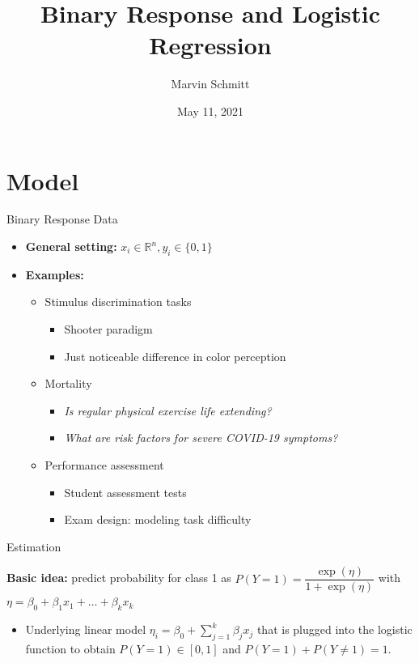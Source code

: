\documentclass[
  ignorenonframetext,
]{beamer}
\title{Binary Response and Logistic Regression}
\author{Marvin Schmitt}
\date{May 11, 2021}
\providecommand{\tightlist}{%
  \setlength{\itemsep}{0pt}\setlength{\parskip}{0pt}}
\begin{document}
\frame{\titlepage}

\begin{frame}
  \tableofcontents[hideallsubsections]
\end{frame}
\hypertarget{model}{%
\section{Model}\label{model}}

\begin{frame}{Binary Response Data}
\protect\hypertarget{binary-response-data}{}

\begin{itemize}
\tightlist
\item
  \textbf{General setting:} \(x_i\in\mathbb{R}^n, y_i\in\{0,1\}\)
\item
  \textbf{Examples:}

  \begin{itemize}
  \tightlist
  \item
    Stimulus discrimination tasks

    \begin{itemize}
    \tightlist
    \item
      Shooter paradigm
    \item
      Just noticeable difference in color perception
    \end{itemize}
  \item
    Mortality

    \begin{itemize}
    \tightlist
    \item
      \emph{Is regular physical exercise life extending?}
    \item
      \emph{What are risk factors for severe COVID-19 symptoms?}
    \end{itemize}
  \item
    Performance assessment

    \begin{itemize}
    \tightlist
    \item
      Student assessment tests
    \item
      Exam design: modeling task difficulty
    \end{itemize}
  \end{itemize}
\end{itemize}

\end{frame}

\begin{frame}{Estimation}
\protect\hypertarget{estimation}{}

\textbf{Basic idea:} predict probability for class 1 as
\(P(Y=1)=\dfrac{\exp(\eta)}{1+\exp(\eta)}\) with
\(\eta=\beta_0+\beta_1x_1+\ldots +\beta_kx_k\)

\begin{itemize}
\tightlist
\item
  Underlying linear model
  \(\eta_i = \beta_0+\sum\limits_{j=1}^k\beta_jx_j\) that is plugged
  into the logistic function to obtain \(P(Y=1)\in[0, 1]\) and
  \(P(Y=1)+P(Y\neq1)=1\).
\end{itemize}

\end{frame}
\end{document}
